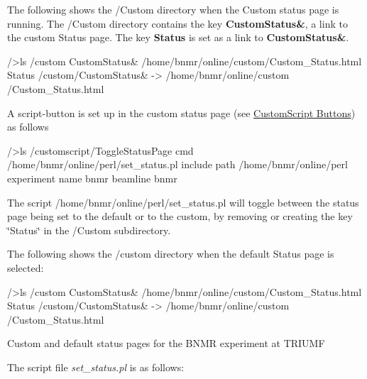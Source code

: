 The following shows the /Custom directory when the Custom status page is running. The /Custom directory contains the key {\bfseries CustomStatus\&}, a link to the custom Status page. The key {\bfseries Status} is set as a link to {\bfseries CustomStatus\&}. 
\begin{DoxyCode}
/>ls /custom
CustomStatus&                   /home/bnmr/online/custom/Custom_Status.html
Status                          /custom/CustomStatus& -> /home/bnmr/online/custom
      /Custom_Status.html
\end{DoxyCode}


A script-\/button is set up in the custom status page (see \hyperlink{RC_mhttpd_custom_features_RC_mhttpd_custom_script_buttons}{CustomScript Buttons}) as follows


\begin{DoxyCode}
/>ls /customscript/ToggleStatusPage
cmd                             /home/bnmr/online/perl/set_status.pl
include path                    /home/bnmr/online/perl
experiment name                 bnmr
beamline                        bnmr
\end{DoxyCode}


The script /home/bnmr/online/perl/set\_\-status.pl will toggle between the status page being set to the default or to the custom, by removing or creating the key \char`\"{}Status\char`\"{} in the /Custom subdirectory.

The following shows the /custom directory when the default Status page is selected: 
\begin{DoxyCode}
/>ls /custom
CustomStatus&                   /home/bnmr/online/custom/Custom_Status.html
Status                          /custom/CustomStatus& -> /home/bnmr/online/custom
      /Custom_Status.html
\end{DoxyCode}


\begin{center} Custom and default status pages for the BNMR experiment at TRIUMF  \end{center} 

The script file {\itshape  set\_\-status.pl \/} is as follows:


